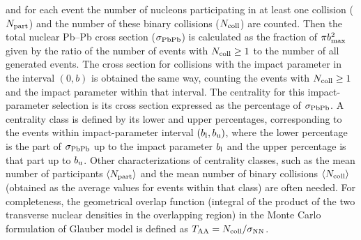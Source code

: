 and for each event the number of nucleons participating in at least one collision ($N_{\rm part}$) and the number of these binary collisions ($N_{\rm coll}$) are counted. Then the total nuclear Pb--Pb cross section ($\sigma_{\rm PbPb}$) is calculated as the fraction of $\pi b_{\rm max}^2$ given by the ratio of the number of events with $N_{\rm coll} \geq 1$ to the number of all generated events. The cross section for collisions with the impact parameter in the interval $(0, b)$ is obtained the same way, counting the events with $N_{\rm coll} \geq 1$ and the impact parameter within that interval. The centrality for this impact-parameter selection is its cross section expressed as the percentage of $\sigma_{\rm PbPb}$. A centrality class is defined by its lower and upper percentages, corresponding to the events within impact-parameter interval $(b_{\rm l}, b_{\rm u})$, where the lower percentage is the part of $\sigma_{\rm PbPb}$ up to the impact parameter $b_{\rm l}$ and the upper percentage is that part up to $b_{\rm u}$. Other characterizations of centrality classes, such as the mean number of participants $\langle N_{\rm part} \rangle$ and the mean number of binary collisions $\langle N_{\rm coll} \rangle$ (obtained as the average values for events within that class) are often needed. For completeness, the geometrical overlap function (integral of the product of the two transverse nuclear densities in the overlapping region) in the Monte Carlo formulation of Glauber model is defined as $T_{\rm AA} = N_{\rm coll} / \sigma_{\rm NN}$.

